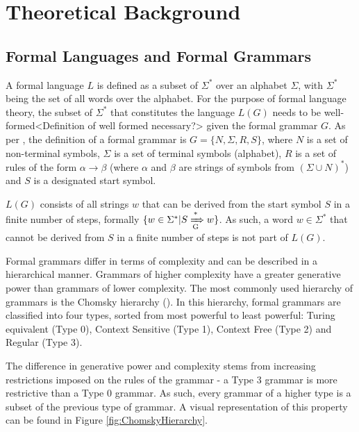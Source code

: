 \section{Theoretical Background}\label{theoreticalBackground}


\subsection{Formal Languages and Formal Grammars}\label{formalLanguages}
A formal language $L$ is defined as a subset of $\Sigma^{*}$ over an alphabet $\Sigma$, with $\Sigma^{*}$ being the set of all words over the alphabet. For the purpose of formal language theory, the subset of $\Sigma^{*}$ that constitutes the language $L(G)$ needs to be well-formed<Definition of well formed necessary?> given the formal grammar $G$.
As per \cite{JurafskyMartin2009}, the definition of a formal grammar is $G = \lbrace N, \Sigma, R, S \rbrace$, where $N$ is a set of non-terminal symbols, $\Sigma$ is a set of terminal symbols (alphabet), $R$ is a set of rules of the form $\alpha \rightarrow \beta$ (where $\alpha$ and $\beta$ are strings of symbols from $(\Sigma \cup N)^{*}$) and $S$ is a designated start symbol.

$L(G)$ consists of all strings $w$ that can be derived from the start symbol $S$ in a finite number of steps, formally $\lbrace w \in \Sigma^{*} | S \xRightarrow [\text{G}]{\text{*}} w \rbrace$. As such, a word $w \in \Sigma^{*}$ that cannot be derived from $S$ in a finite number of steps is not part of $L(G)$.

Formal grammars differ in terms of complexity and can be described in a hierarchical manner. Grammars of higher complexity have a greater generative power than grammars of lower complexity. The most commonly used hierarchy of grammars is the Chomsky hierarchy (\cite{Chomsky1959}). In this hierarchy, formal grammars are classified into four types, sorted from most powerful to least powerful: Turing equivalent (Type 0), Context Sensitive (Type 1), Context Free (Type 2) and Regular (Type 3).

The difference in generative power and complexity stems from increasing restrictions imposed on the rules of the grammar - a Type 3 grammar is more restrictive than a Type 0 grammar. As such, every grammar of a higher type is a subset of the previous type of grammar. A visual representation of this property can be found in Figure \ref{fig:ChomskyHierarchy}.

